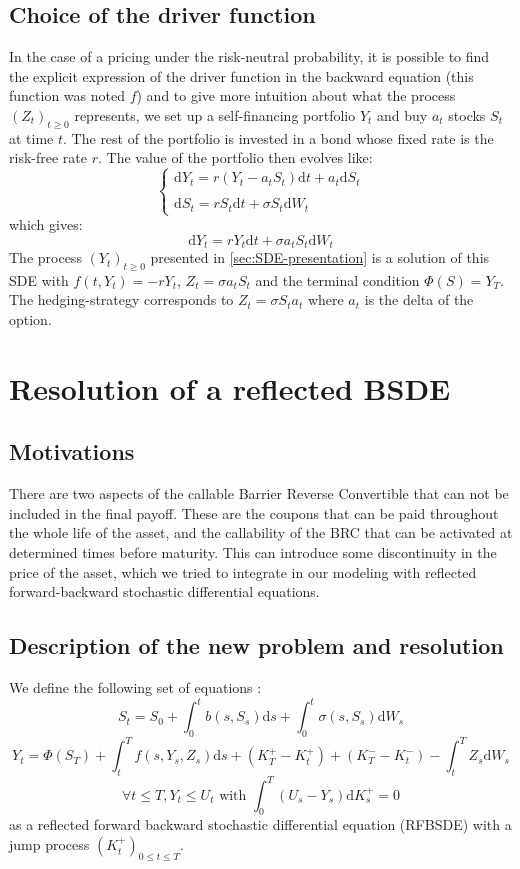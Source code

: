 \documentclass[a4paper,11pt,english]{book}
\begin{document}
\subsection{Choice of the driver function}
\label{subsec:choice-of-f}
In the case of a pricing under the risk-neutral probability, it is possible to find the explicit expression of the driver function in the backward equation (this function was noted $f$) and to give more intuition about what the process $(Z_{t})_{t\geq0}$ represents, we set up a self-financing portfolio $Y_{t}$ and buy $a_{t}$ stocks $S_{t}$ at time $t$. The rest of the portfolio is invested in a bond whose fixed rate is the risk-free rate $r$. The value of the portfolio then evolves like:
$$\begin{cases}
\text{d}Y_{t} = r(Y_{t}-a_{t}S_{t})\text{d}t + a_{t}\text{d}S_{t}\\
 \\
\text{d}S_{t}=rS_t\text{d}t+\sigma S_t\text{d}W_{t}
\end{cases}$$
which gives:
$$\text{d}Y_{t} = rY_{t}\text{d}t + \sigma a_{t}S_{t}\text{d}W_{t}$$
The process $(Y_{t})_{t\geq0}$ presented in \ref{sec:SDE-presentation} is a solution of this SDE with $f(t,Y_{t})=-rY_{t}$, $Z_{t} = \sigma a_{t}S_{t}$ and the terminal condition $\Phi(S)=Y_{T}$.
The hedging-strategy corresponds to $Z_{t}=\sigma S_{t} a_{t}$ where $a_{t}$ is the delta of the option. 

\section{Resolution of a reflected BSDE}
\subsection{Motivations}
There are two aspects of the callable Barrier Reverse Convertible that can not be included in the final payoff. These are the coupons that can be paid throughout the whole life of the asset, and the callability of the BRC that can be activated at determined times before maturity. This can introduce some discontinuity in the price of the asset, which we tried to integrate in our modeling with reflected forward-backward stochastic differential equations.
\subsection{Description of the new problem and resolution}
We define the following set of equations :
$$S_{t}=S_{0} + \int_{0}^{t}b(s,S_{s})\text{d}s + \int_{0}^{t}\sigma(s,S_{s})\text{d}W_{s}$$
$$Y_{t}=\Phi(S_{T})+\int_{t}^{T}f(s,Y_{s},Z_{s})\text{d}s+(K_{T}^{+}-K_{t}^{+})+(K_{T}^{-}-K_{t}^{-})-\int_{t}^{T}Z_{s}\text{d}W_{s}$$
$$\forall t\leq T, Y_{t}\leq U_{t} \text{ with } \int_{0}^{T}(U_{s}-Y_{s})\text{d}K_{s}^{+}=0 $$
as a reflected forward backward stochastic differential equation (RFBSDE) with a jump process $(K_{t}^{+})_{0\leq t \leq T}$.
\end{document}
